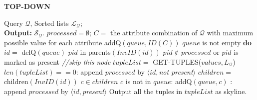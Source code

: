 \begin{algorithm}[!htb]
\caption{{\bf TOP-DOWN}}
\begin{algorithmic}[1]
\label{alg:st}
 Query $\mathcal{Q}$, Sorted lists $\mathcal{L_Q}$; \\ {\bf Output:} $\mathcal{S}_\mathcal{Q}$.
\STATE $processed = \emptyset$;
\STATE $C = $ the attribute combination of $\mathcal{Q}$ with maximum possible value for each attribute
\STATE addQ$(queue,ID(C))$
 $queue$ is not empty {\bf do}
    \STATE \hindent $id =$ delQ$(queue)$
    \STATE {} $pid$ in parents$(InvID(id))$
        \STATE {} $pid\notin processed$ or $pid$ is marked as present
            \STATE {} {\it //skip this node}
    \STATE \hindent $tupleList = $ GET-TUPLES($values, L_\mathcal{Q}$)        
    \STATE {} $len(tupleList) == 0$:
        \STATE \hindent[2] append $processed$ by $\langle id,$\textit{not present}$\rangle$
        \STATE \hindent[2] $children = $ children$(InvID(id))$
        \STATE {} $c\in children$
            \STATE {} $c$ is not in $queue$: addQ$(queue,c)$
    \STATE {}:
        \STATE \hindent[2] append $processed$ by $\langle id,$\textit{present}$\rangle$
        \STATE \hindent[2] Output all the tuples in $tupleList$ as skyline.    
\end{algorithmic}
\end{algorithm}

\vspace{1mm}
